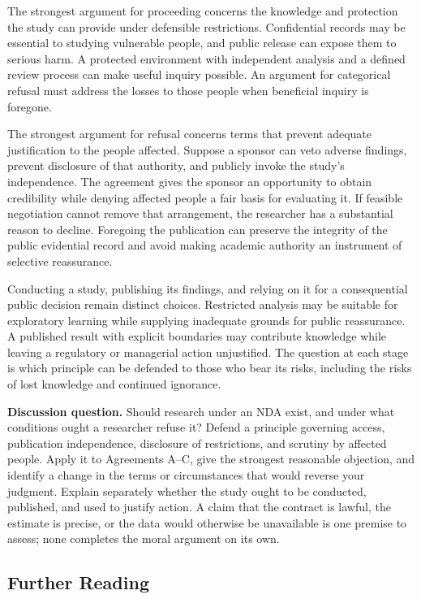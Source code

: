 The strongest argument for proceeding concerns the knowledge and
protection the study can provide under defensible restrictions.
Confidential records may be essential to studying vulnerable people, and
public release can expose them to serious harm. A protected environment
with independent analysis and a defined review process can make useful
inquiry possible. An argument for categorical refusal must address the
losses to those people when beneficial inquiry is foregone.

The strongest argument for refusal concerns terms that prevent adequate
justification to the people affected. Suppose a sponsor can veto adverse
findings, prevent disclosure of that authority, and publicly invoke the
study's independence. The agreement gives the sponsor an opportunity to
obtain credibility while denying affected people a fair basis for
evaluating it. If feasible negotiation cannot remove that arrangement,
the researcher has a substantial reason to decline. Foregoing the
publication can preserve the integrity of the public evidential record
and avoid making academic authority an instrument of selective
reassurance.

Conducting a study, publishing its findings, and relying on it for a
consequential public decision remain distinct choices. Restricted
analysis may be suitable for exploratory learning while supplying
inadequate grounds for public reassurance. A published result with
explicit boundaries may contribute knowledge while leaving a regulatory
or managerial action unjustified. The question at each stage is which
principle can be defended to those who bear its risks, including the
risks of lost knowledge and continued ignorance.

\textbf{Discussion question.} Should research under an NDA exist, and
under what conditions ought a researcher refuse it? Defend a principle
governing access, publication independence, disclosure of restrictions,
and scrutiny by affected people. Apply it to Agreements A--C, give the
strongest reasonable objection, and identify a change in the terms or
circumstances that would reverse your judgment. Explain separately
whether the study ought to be conducted, published, and used to justify
action. A claim that the contract is lawful, the estimate is precise, or
the data would otherwise be unavailable is one premise to assess; none
completes the moral argument on its own.

\hypertarget{M09-further-reading-1}{%
\subsection*{Further Reading}\label{M09-further-reading-1}}

